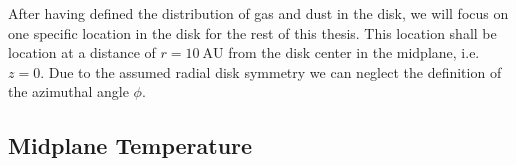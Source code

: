     After having defined the distribution of gas and dust in the disk, we will focus on one 
    specific location in the disk for the rest of this thesis. This location shall be location at 
    a distance of $r=10\ \text{AU}$ from the disk center in the midplane, i.e. $z=0$. Due to 
    the assumed radial disk symmetry we can neglect the definition of the azimuthal angle $\phi$.

    
    
    
    
\clearpage\subsection{Midplane Temperature}



